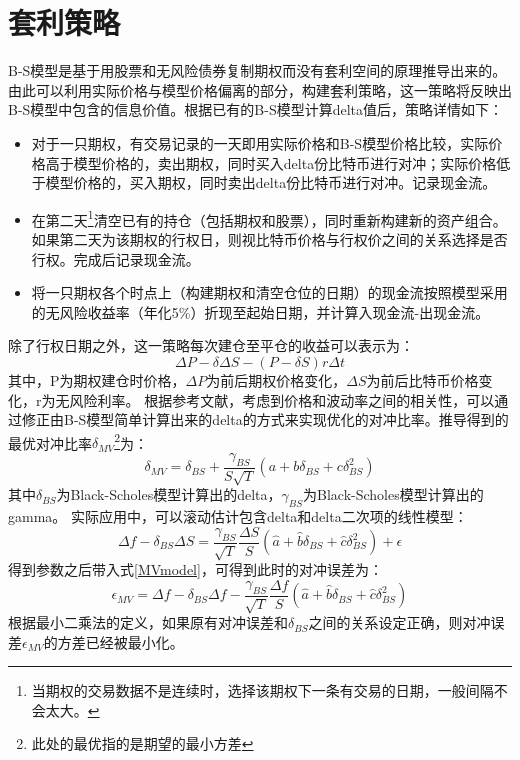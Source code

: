     \section{套利策略}\label{strategy}
    B-S模型是基于用股票和无风险债券复制期权而没有套利空间的原理推导出来的。由此可以利用实际价格与模型价格偏离的部分，构建套利策略，这一策略将反映出B-S模型中包含的信息价值。根据已有的B-S模型计算delta值后，策略详情如下：
    \begin{itemize}
        \item 对于一只期权，有交易记录的一天即用实际价格和B-S模型价格比较，实际价格高于模型价格的，卖出期权，同时买入delta份比特币进行对冲；实际价格低于模型价格的，买入期权，同时卖出delta份比特币进行对冲。记录现金流。
        \item 在第二天\footnote{当期权的交易数据不是连续时，选择该期权下一条有交易的日期，一般间隔不会太大。}清空已有的持仓（包括期权和股票），同时重新构建新的资产组合。如果第二天为该期权的行权日，则视比特币价格与行权价之间的关系选择是否行权。完成后记录现金流。
        \item 将一只期权各个时点上（构建期权和清空仓位的日期）的现金流按照模型采用的无风险收益率（年化5$\%$）折现至起始日期，并计算入现金流-出现金流。
    \end{itemize}
    除了行权日期之外，这一策略每次建仓至平仓的收益可以表示为：
    \begin{equation}
        \Delta{P}-\delta{\Delta{S}}-(P-\delta{S})r\Delta{t}
    \end{equation}
    其中，P为期权建仓时价格，$\Delta{P}$为前后期权价格变化，$\Delta{S}$为前后比特币价格变化，r为无风险利率。
    根据参考文献\cite{Hull-2017}，考虑到价格和波动率之间的相关性，可以通过修正由B-S模型简单计算出来的delta的方式来实现优化的对冲比率。推导得到的最优对冲比率$\delta_{MV}$\footnote{此处的最优指的是期望的最小方差}为：
    \begin{equation}\label{MVmodel}
        \delta_{MV}=\delta_{BS}+\frac{\gamma_{BS}}{S\sqrt{T}}(a+b\delta_{BS}+c\delta^2_{BS})
    \end{equation}
    其中$\delta_{BS}$为Black-Scholes模型计算出的delta，$\gamma_{BS}$为Black-Scholes模型计算出的gamma。
    实际应用中，可以滚动估计包含delta和delta二次项的线性模型：
    \begin{equation}
        \Delta{f}-\delta_{BS}\Delta{S}=\frac{\gamma_{BS}}{\sqrt{T}}\frac{\Delta{S}}{S}(\hat{a}+\hat{b}\delta_{BS}+\hat{c}\delta^2_{BS})+\epsilon
    \end{equation}
    得到参数之后带入式\ref{MVmodel}，可得到此时的对冲误差为：
    \begin{equation}
        \epsilon_{MV}=\Delta{f}-\delta_{BS}\Delta{f}-\frac{\gamma_{BS}}{\sqrt{T}}\frac{\Delta{f}}{S}(\hat{a}+\hat{b}\delta_{BS}+\hat{c}\delta^2_{BS})
    \end{equation}
    根据最小二乘法的定义，如果原有对冲误差和$\delta_{BS}$之间的关系设定正确，则对冲误差$\epsilon_{MV}$的方差已经被最小化。
    